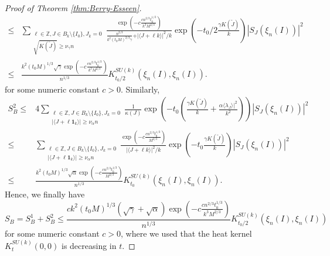 \documentclass[10pt,11pt]{amsart}%
\begin{document}
\begin{proof}[Proof of Theorem \ref{thm:Berry-Esseen}]
\begin{align*}
\leq &\sum_{\substack{\ell\in\mathbb{Z},J\in B_{k}\setminus\{I_0\}, J_{k}=0\\\sqrt{K(\tilde{J})}\geq \nu_{\gamma} n}}\frac{\exp\left(-c\frac{cn^{2/3}t_0^{1/3}}{k^3M^{2/3}} \right)}{\frac{n^{2/3}}{k^2(t_0M)^{2/3}\gamma}+\vert\langle J+\ell k\rangle\vert^2/k}\exp\left(-t_0/2\frac{\gamma K(\tilde{J})}{k}\right)\left\vert S_{J}(\xi_n(I))\right\vert^2\\
\leq &\frac{k^2(t_0M)^{1/3}\sqrt{\gamma}\exp\left(-c\frac{cn^{2/3}t_0^{1/3}}{k^3M^{2/3}} \right)}{n^{1/3}}K_{t_0/2}^{SU(k)}(\xi_n(I),\xi_n(I)).
\end{align*}
for some numeric constant $c>0$. Similarly,
\begin{align*}
S_B^2\leq & 4\sum_{\substack{\ell\in\mathbb{Z},J\in B_{k}\setminus\{I_0\}, J_{k}=0\\\vert\langle J+\ell\mathbf{1}_k\rangle\vert \geq \nu_{\alpha}n}}\frac{1}{\kappa(J)}\exp\left(-t_0\left(\frac{\gamma K(\tilde{J})}{k}+\frac{\alpha\langle \lambda_J\rangle\vert^2}{k^2}\right)\right)\left\vert S_{J}(\xi_n(I))\right\vert^2\\
\leq &\sum_{\substack{\ell\in\mathbb{Z},J\in B_{k}\setminus\{I_0\}, J_{k}=0\\\vert\langle J+\ell\mathbf{1}_k\rangle\vert \geq \nu_{\alpha}n}}\frac{\exp\left(-c\frac{cn^{2/3}t_0^{1/3}}{M^{2/3}} \right)}{\vert\langle J+\ell k\rangle\vert^2/k}\exp\left(-t_0\frac{\gamma K(\tilde{J})}{k}\right)\left\vert S_{J}(\xi_n(I))\right\vert^2\\
\leq &\frac{k^2(t_0M)^{1/3}\sqrt{\alpha}\exp\left(-c\frac{cn^{2/3}t_0^{1/3}}{M^{2/3}} \right)}{n^{1/3}}K_{t_0}^{SU(k)}(\xi_n(I),\xi_n(I)).
\end{align*}
Hence, we finally have 
$$S_{B}=S_{B}^1+S_{B}^2\leq \frac{ck^2(t_0M)^{1/3}(\sqrt{\gamma}+\sqrt{\alpha})\exp\left(-c\frac{cn^{2/3}t_0^{1/3}}{k^3M^{2/3}} \right)}{n^{1/3}}K_{t_0/2}^{SU(k)}(\xi_n(I),\xi_n(I))$$
for some numeric constant $c>0$, where we used that the heat kernel $K_{t}^{SU(k)}(0,0)$ is decreasing in $t$.


\end{proof}
\end{document}
